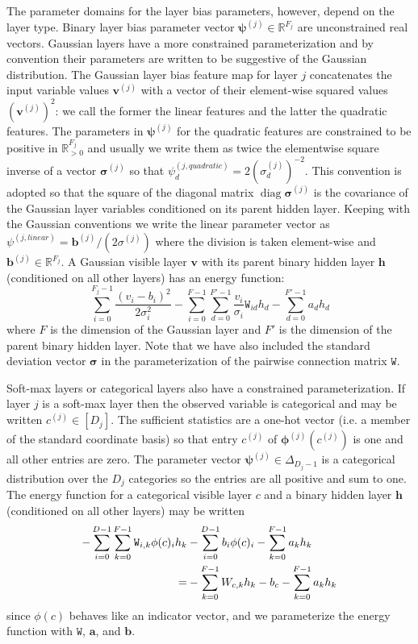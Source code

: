 \documentclass{article} %
\newcommand{\diag}{\mathop{\mathrm{diag}}}
\begin{document}
The parameter domains for the
layer bias parameters, however, depend on the layer type.  Binary layer bias parameter vector $\boldsymbol{\psi}^{(j)}\in\mathbb{R}^{F_j}$
are unconstrained real vectors.  Gaussian layers have a more constrained parameterization and by convention their parameters
are written to be suggestive of the Gaussian distribution.  The Gaussian layer bias feature map for layer $j$ 
concatenates the input variable values
$\mathbf{v}^{(j)}$ with a vector of their element-wise squared values $(\mathbf{v}^{(j)})^2$: we call the former the linear features
and the latter the quadratic features.  The parameters in $\boldsymbol{\psi}^{(j)}$ for the quadratic features are constrained to be positive
in $\mathbb{R}^{F_j}_{>0}$ and usually we write them as twice the elementwise square inverse of a vector $\boldsymbol{\sigma}^{(j)}$ so that
$\psi^{(j,quadratic)}_d = 2(\sigma^{(j)}_d)^{-2}$. This convention is adopted so that the square of the diagonal matrix $\diag\boldsymbol{\sigma}^{(j)}$ is the covariance of the Gaussian layer variables conditioned on its parent hidden layer. Keeping with the Gaussian conventions we write
the linear parameter vector as $\psi^{(j,linear)} = \mathbf{b}^{(j)}/(2\sigma^{(j)})$ where the division is taken element-wise and $\mathbf{b}^{(j)}\in\mathbb{R}^{F_j}$.  A Gaussian visible layer $\mathbf{v}$ with its parent binary hidden layer $\mathbf{h}$ (conditioned on all other layers) has
an energy function:
\begin{equation}
  \sum_{i=0}^{F_j-1} \frac{(v_i - b_i)^2}{2\sigma_i^2} - \sum_{i=0}^{F-1}\sum_{d=0}^{F'-1} \frac{v_i}{\sigma_i}\mathtt{W}_{id}h_d - \sum_{d=0}^{F'-1} a_d h_d
\end{equation}
where $F$ is the dimension of the Gaussian layer and $F'$ is the dimension of the parent binary hidden layer. Note that we have also included
the standard deviation vector $\boldsymbol{\sigma}$ in the parameterization of the pairwise connection matrix $\mathtt{W}$.

Soft-max layers or categorical layers also have a constrained
parameterization.  If layer $j$ is a soft-max layer then the observed
variable is categorical and may be written $c^{(j)}\in [D_j]$.  The
sufficient statistics are a one-hot vector (i.e. a member of the
standard coordinate basis) so that entry $c^{(j)}$ of
$\boldsymbol{\phi}^{(j)}(c^{(j)})$ is one and all other entries are
zero.  The parameter vector $\boldsymbol{\psi}^{(j)}\in
\Delta_{D_j-1}$ is a categorical distribution over the $D_j$
categories so the entries are all positive and sum to one.  The energy
function for a categorical visible layer $c$ and a binary hidden layer
$\mathbf{h}$ (conditioned on all other layers) may be written
\begin{align}\label{eq:categorical-hidden-dbm}
- \sum_{i=0}^{D-1}\sum_{k=0}^{F-1}\mathtt{W}_{i,k} \phi(c)_i h_k& - \sum_{i=0}^{D-1} b_i \phi(c)_i  - \sum_{k=0}^{F-1} a_k h_k \notag\\
=& - \sum_{k=0}^{F-1} W_{c,k}h_k - b_c - \sum_{k=0}^{F-1} a_k h_k
\end{align}
since $\phi(c)$ behaves like an indicator vector, and we parameterize the energy function with $\mathtt{W}$, $\mathbf{a}$, and $\mathbf{b}$.
\end{document}

